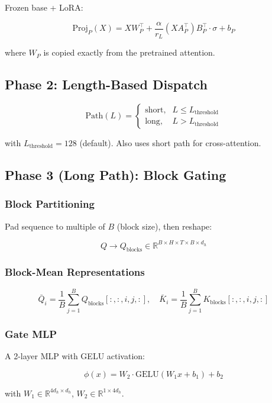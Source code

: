 Frozen base + LoRA:

\[
\text{Proj}_P(X) = X W_P^\top + \frac{\alpha}{r_L} (X A_P^\top) B_P^\top \cdot \sigma + b_P
\tag{4.1}
\]

where $W_P$ is copied exactly from the pretrained attention.

\subsection{Phase 2: Length-Based Dispatch}

\[
\text{Path}(L) = \begin{cases}
\text{short}, & L \leq L_\text{threshold} \\
\text{long}, & L > L_\text{threshold}
\end{cases}
\tag{4.2}
\]

with $L_\text{threshold} = 128$ (default). Also uses short path for 
cross-attention.

\subsection{Phase 3 (Long Path): Block Gating}

\subsubsection{Block Partitioning}

Pad sequence to multiple of $B$ (block size), then reshape:

\[
Q \to Q_\text{blocks} \in \mathbb{R}^{B \times H \times T \times B \times d_h}
\tag{4.3}
\]

\subsubsection{Block-Mean Representations}

\[
\bar{Q}_i = \frac{1}{B} \sum_{j=1}^{B} Q_\text{blocks}[:, :, i, j, :], \quad
\bar{K}_i = \frac{1}{B} \sum_{j=1}^{B} K_\text{blocks}[:, :, i, j, :]
\tag{4.4}
\]

\subsubsection{Gate MLP}

A 2-layer MLP with GELU activation:

\[
\phi(x) = W_2 \cdot \text{GELU}(W_1 x + b_1) + b_2
\tag{4.5}
\]

with $W_1 \in \mathbb{R}^{4 d_h \times d_h}$, $W_2 \in \mathbb{R}^{1 \times 4 d_h}$.


